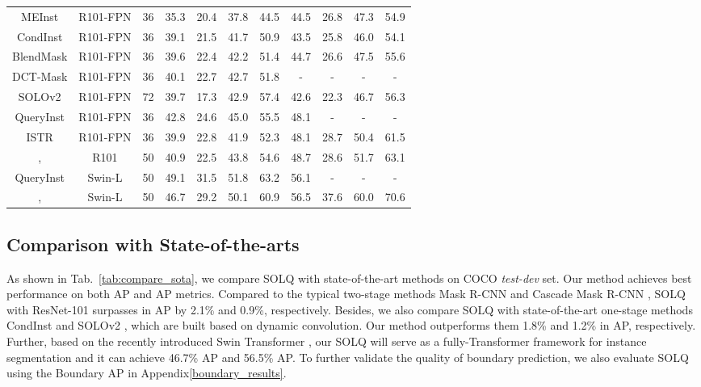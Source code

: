 \documentclass{article}
\begin{document}
\begin{table*}[h]
{{\begin{tabular}{c|c|c|cccc|cccc}
MEInst \cite{zhang2020meinst} & R101-FPN & 36 & 35.3 & 20.4 & 37.8 & 44.5 & 44.5 & 26.8 & 47.3 & 54.9 \\
CondInst \cite{tian2020conditional} & R101-FPN & 36 & 39.1 & 21.5 & 41.7 & 50.9 & 43.5 & 25.8 & 46.0 & 54.1 \\
BlendMask \cite{chen2020blendmask} & R101-FPN & 36 & 39.6 & 22.4 & 42.2 & 51.4 & 44.7 & 26.6 & 47.5 & 55.6 \\
DCT-Mask \cite{shen2020dct} & R101-FPN & 36 & 40.1 & 22.7 & 42.7 & 51.8 & - & - & - & - \\
SOLOv2 \cite{wang2020solov2} & R101-FPN & 72 & 39.7 & 17.3 & 42.9 & 57.4 & 42.6 & 22.3 & 46.7 & 56.3 \\
QueryInst \cite{queryinst2021} & R101-FPN & 36 & 42.8 & 24.6 & 45.0 & 55.5 & 48.1 & - & - & - \\
ISTR \cite{hu2021istr} & R101-FPN & 36 & 39.9 & 22.8 & 41.9 & 52.3 & 48.1 & 28.7 & 50.4 & 61.5 \\
\hline
{, } & R101 & 50 & 40.9 & 22.5 & 43.8 & 54.6 & 48.7 & 28.6 & 51.7 & 63.1 \\
\hline\hline
QueryInst \cite{queryinst2021} & Swin-L & 50 & 49.1 & 31.5 & 51.8 & 63.2 & 56.1 & - & - & - \\
{, } & Swin-L & 50 & 46.7 & 29.2 & 50.1 & 60.9 & 56.5 & 37.6 & 60.0 & 70.6 \\
\hline
\end{tabular}
}
}
\label{tab:compare_sota}
\end{table*}


\subsection{Comparison with State-of-the-arts}
As shown in Tab.~\ref{tab:compare_sota}, we compare SOLQ with state-of-the-art methods on COCO \textit{test-dev} set. Our method achieves best performance on both AP and AP metrics. Compared to the typical two-stage methods Mask R-CNN \cite{he2017maskrcnn} and Cascade Mask R-CNN \cite{cai2018cascade}, SOLQ with ResNet-101 surpasses in AP by 2.1\% and 0.9\%, respectively. Besides, we also compare SOLQ with state-of-the-art one-stage methods CondInst \cite{tian2020conditional} and SOLOv2 \cite{wang2020solov2}, which are built based on dynamic convolution. Our method outperforms them 1.8\% and 1.2\% in AP, respectively. Further, based on the recently introduced Swin Transformer \cite{liu2021swin}, our SOLQ will serve as a fully-Transformer framework for instance segmentation and it can achieve 46.7\% AP and 56.5\% AP. To further validate the quality of boundary prediction, we also evaluate SOLQ using the Boundary AP \cite{cheng2021boundaryiou} in Appendix\ref{boundary_results}.
\end{document}
